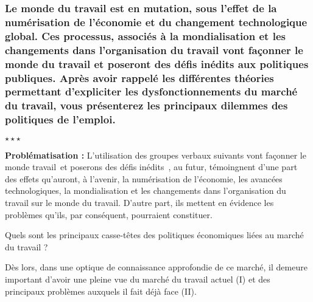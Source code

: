 \newpage %
	\subsubsection*{Le monde du travail est en mutation, sous l’effet de la numérisation de l’économie et du changement technologique global. Ces processus, associés à la mondialisation et les changements dans l’organisation du travail vont façonner le monde du travail et poseront des défis inédits aux politiques publiques. \newline \newline Après avoir rappelé les différentes théories permettant d’expliciter les dysfonctionnements du marché du travail, vous présenterez les principaux dilemmes des politiques de l’emploi. \newline
	}
\begin{center}
	$\star \star \star$
\end{center}

\noindent \textbf{Problématisation :} L'utilisation des groupes verbaux suivants \guillemetleft vont façonner le monde travail\guillemetright\ et \guillemetleft poserons des défis inédits\guillemetright\ , au futur, témoingnent d'une part des effets qu'auront, à l'avenir, la numérisation de l'économie, les avancées technologiques, la mondialisation et les changements dans l'organisation du travail sur le monde du travail. D'autre part, ils mettent en évidence les problèmes qu'ils, par conséquent, pourraient constituer. 

Quels sont les principaux casse-têtes des politiques économiques liées au marché du travail ?\newline

Dès lors, dans une optique de connaissance approfondie de ce marché, il demeure important d'avoir une pleine vue du marché du travail actuel (I) et des principaux problèmes auxquels il fait déjà face (II).


